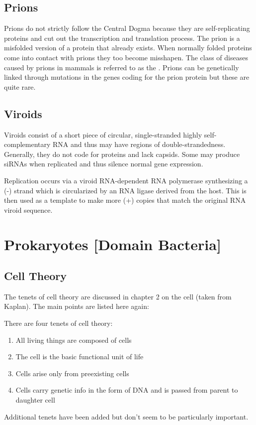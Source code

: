 \documentclass[../Bio_chemistryReview.tex]{subfiles}
\begin{document}
\subsection{Prions}
Prions do not strictly follow the Central Dogma because they are
self-replicating proteins and cut out the transcription and translation process.
The prion is a misfolded version of a protein that already exists. When normally
folded proteins come into contact with prions they too become misshapen. The
class of diseases caused by prions in mammals is referred to as the
. Prions can be genetically
linked through mutations in the genes coding for the prion protein but these are
quite rare.

\subsection{Viroids}
Viroids consist of a short piece of circular, single-stranded highly
self-complementary RNA and thus may have regions of double-strandedness.
Generally, they do not code for proteins and lack capsids. Some may produce
siRNAs when replicated and thus silence normal gene expression.\par

Replication occurs via a viroid RNA-dependent RNA polymerase synthesizing a
(-) strand which is circularized by an RNA ligase derived from the host. This is
then used as a template to make more (+) copies that match the original RNA
viroid sequence.

\section{Prokaryotes [Domain Bacteria]}
\subsection{Cell Theory}
The tenets of cell theory are discussed in chapter 2 on the cell (taken from
Kaplan). The main points are listed here again:
\begin{infobox}
  There are four tenets of cell theory:
  \begin{enumerate}
    \item All living things are composed of cells
    \item The cell is the basic functional unit of life
    \item Cells arise only from preexisting cells
    \item Cells carry genetic info in the form of DNA and is passed from parent
      to daughter cell 
  \end{enumerate}
\end{infobox}
Additional tenets have been added but don't seem to be particularly
important.\par
\end{document}
